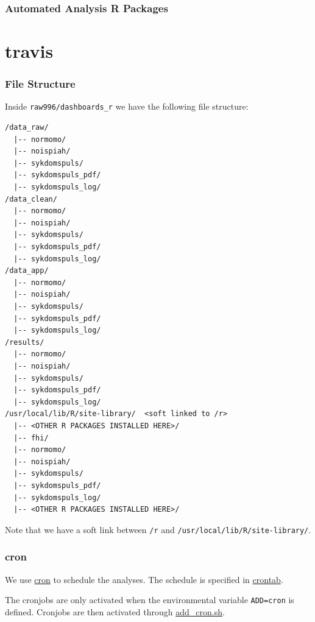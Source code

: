 \documentclass[12pt,]{article}
\begin{document}
\subsubsection{Automated Analysis R
Packages}\label{automated-analysis-r-packages}

\section{travis}\label{travis}

\hypertarget{internalfilestructure}{\subsubsection{File
Structure}\label{internalfilestructure}}

Inside \texttt{raw996/dashboards\_r} we have the following file
structure:

\begin{verbatim}
/data_raw/
  |-- normomo/
  |-- noispiah/
  |-- sykdomspuls/
  |-- sykdomspuls_pdf/
  |-- sykdomspuls_log/
/data_clean/
  |-- normomo/
  |-- noispiah/
  |-- sykdomspuls/
  |-- sykdomspuls_pdf/
  |-- sykdomspuls_log/
/data_app/
  |-- normomo/
  |-- noispiah/
  |-- sykdomspuls/
  |-- sykdomspuls_pdf/
  |-- sykdomspuls_log/
/results/
  |-- normomo/
  |-- noispiah/
  |-- sykdomspuls/
  |-- sykdomspuls_pdf/
  |-- sykdomspuls_log/
/usr/local/lib/R/site-library/  <soft linked to /r>
  |-- <OTHER R PACKAGES INSTALLED HERE>/
  |-- fhi/
  |-- normomo/
  |-- noispiah/
  |-- sykdomspuls/
  |-- sykdomspuls_pdf/
  |-- sykdomspuls_log/
  |-- <OTHER R PACKAGES INSTALLED HERE>/
\end{verbatim}

Note that we have a soft link between \texttt{/r} and
\texttt{/usr/local/lib/R/site-library/}.

\hypertarget{cron}{\subsubsection{cron}\label{cron}}

We use \href{https://en.wikipedia.org/wiki/Cron}{cron} to schedule the
analyses. The schedule is specified in
\href{https://github.com/raubreywhite/dashboards_control/blob/master/infrastructure/dashboards_r/crontab}{crontab}.

The cronjobs are only activated when the environmental variable
\texttt{ADD=cron} is defined. Cronjobs are then activated through
\href{https://github.com/raubreywhite/dashboards_control/blob/master/infrastructure/dashboards_r/add_cron.sh}{add\_cron.sh}.
\end{document}
